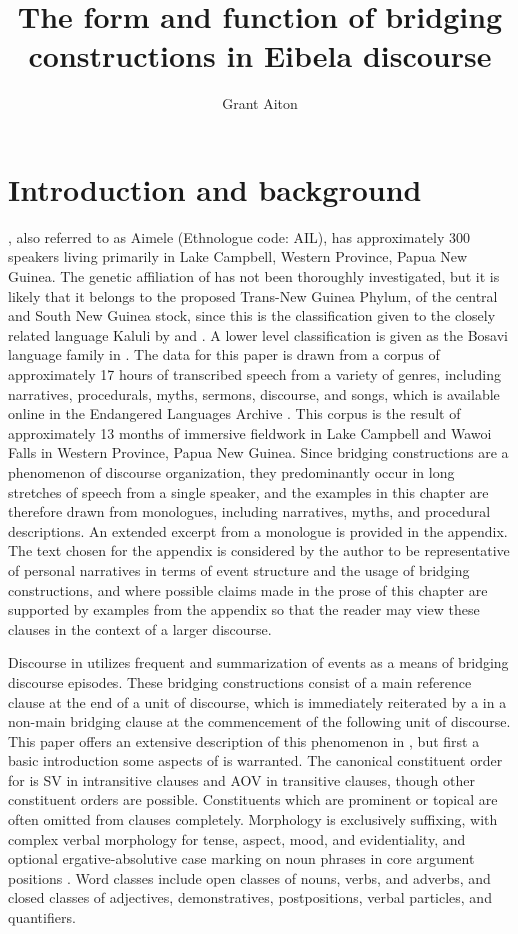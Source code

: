 \documentclass[output=paper]{LSP/langsci}
\author{
   Grant Aiton\affiliation{University of Alberta}
}
\title{The form and function of bridging constructions in Eibela discourse}
\begin{document}
\section{Introduction and background} 
\label{AiIntroduction}
, also referred to as Aimele (Ethnologue code: AIL), has approximately 300 speakers living primarily in Lake Campbell, Western Province, Papua New Guinea. The genetic affiliation of  has not been thoroughly investigated, but it is likely that it belongs to the proposed Trans-New Guinea Phylum, of the central and South New Guinea stock, since this is the classification given to the closely related language Kaluli by \citet{wurm78} and \citet{voorhoeve68}. A lower level classification is given as the Bosavi language family in \citet{shaw86}. The data for this paper is drawn from a corpus of approximately 17 hours of transcribed speech from a variety of genres, including narratives, procedurals, myths, sermons, discourse, and songs, which is available online in the Endangered Languages Archive \citep{Aiton.2016}. This corpus is the result of approximately 13 months of immersive fieldwork in Lake Campbell and Wawoi Falls in Western Province, Papua New Guinea. Since bridging constructions are a phenomenon of discourse organization, they predominantly occur in long stretches of speech from a single speaker, and the examples in this chapter are therefore drawn from monologues, including narratives, myths, and procedural descriptions. An extended excerpt from a monologue is provided in the appendix. The text chosen for the appendix is considered by the author to be representative of personal narratives in terms of event structure and the usage of bridging constructions, and where possible claims made in the prose of this chapter are supported by examples from the appendix so that the reader may view these clauses in the context of a larger discourse.

Discourse in  utilizes frequent  and summarization of events as a means of bridging discourse episodes. These bridging constructions consist of a main reference clause at the end of a unit of discourse, which is immediately reiterated by a  in a non-main bridging clause at the commencement of the following unit of discourse. This paper offers an extensive description of this phenomenon in , but first a basic introduction some aspects of  is warranted. The canonical constituent order for  is SV in intransitive clauses and AOV in transitive clauses, though other constituent orders are possible. Constituents which are prominent or topical are often omitted from clauses completely. Morphology is exclusively suffixing, with complex verbal morphology for tense, aspect, mood, and evidentiality, and optional ergative-absolutive case marking on noun phrases in core argument positions \citep[see][]{Aiton.2014}. Word classes include open classes of nouns, verbs, and adverbs, and closed classes of adjectives, demonstratives, postpositions, verbal particles, and quantifiers.
\end{document}
